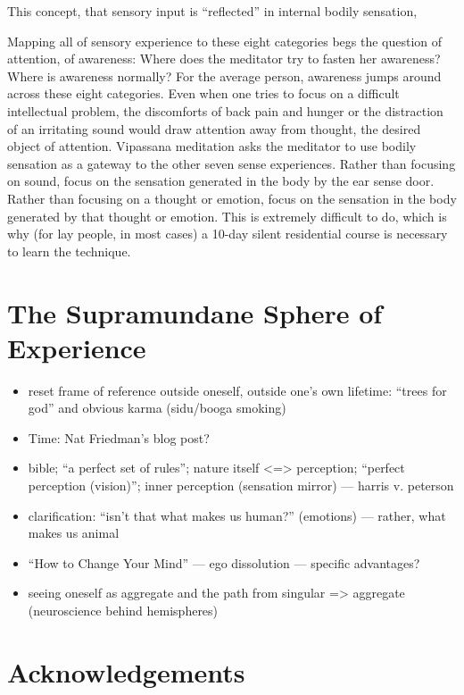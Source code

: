 \documentclass[a4paper, amsfonts, amssymb, amsmath, reprint, showkeys, nofootinbib, twoside]{revtex4-1}
\begin{document}
This concept, that sensory input is ``reflected'' in internal bodily sensation,

Mapping all of sensory experience to these eight categories begs the question of
attention, of awareness: Where does the meditator try to fasten her awareness? Where
is awareness normally? For the average person, awareness jumps around across these
eight categories. Even when one tries to focus on a difficult intellectual problem,
the discomforts of back pain and hunger or the distraction of an irritating sound
would draw attention away from thought, the desired object of attention. Vipassana
meditation asks the meditator to use bodily sensation as a gateway to the other seven
sense experiences. Rather than focusing on sound, focus on the sensation generated in
the body by the ear sense door. Rather than focusing on a thought or emotion, focus
on the sensation in the body generated by that thought or emotion. This is extremely
difficult to do, which is why (for lay people, in most cases) a 10-day silent
residential course \cite{dhamma} is necessary to learn the technique.

\section{The Supramundane Sphere of Experience}

\begin{itemize}
  \item reset frame of reference outside oneself, outside one's own lifetime: ``trees
    for god'' and obvious karma (sidu/booga smoking)
  \item Time: Nat Friedman's blog post?
  \item bible; ``a perfect set of rules''; nature itself <=> perception; ``perfect
    perception (vision)''; inner perception (sensation mirror) --- harris v. peterson
  \item clarification: ``isn't that what makes us human?'' (emotions) --- rather,
    what makes us animal
  \item ``How to Change Your Mind'' --- ego dissolution --- specific advantages?
  \item seeing oneself as aggregate and the path from singular => aggregate
    (neuroscience behind hemispheres)
\end{itemize}


\section*{Acknowledgements}
\end{document}
